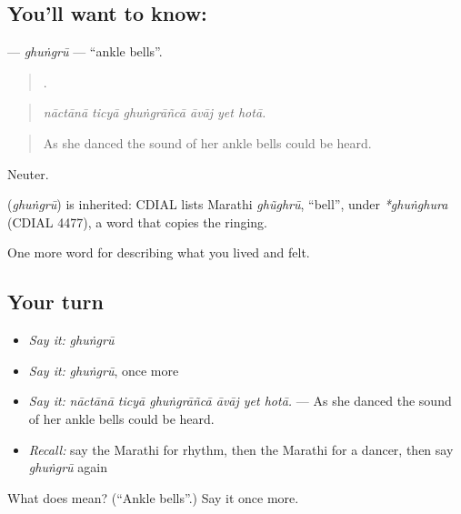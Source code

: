 \subsection*{You'll want to know: }
\textbf{} — \emph{ghuṅgrū} — \textquotedblleft{}ankle bells\textquotedblright{}.

\begin{quote}
     .
\end{quote}

\begin{quote}
\emph{nāctānā ticyā ghuṅgrāñcā āvāj yet hotā.}
\end{quote}

\begin{quote}
As she danced the sound of her ankle bells could be heard.
\end{quote}

Neuter.

\begin{cousinweb}
\textbf{} (\emph{ghuṅgrū}) is inherited: CDIAL lists Marathi \emph{ghũghrū}, \textquotedblleft{}bell\textquotedblright{}, under \emph{*ghuṅghura} (CDIAL 4477), a word that copies the ringing.
\end{cousinweb}

\begin{grammarlens}[title={What you've built}]
One more word for describing what you lived and felt.
\end{grammarlens}

\subsection*{Your turn}
\begin{itemize}
\raggedright
  \item \emph{Say it:} \emph{ghuṅgrū}
  \item \emph{Say it:} \emph{ghuṅgrū}, once more
  \item \emph{Say it:} \emph{nāctānā ticyā ghuṅgrāñcā āvāj yet hotā.} — As she danced the sound of her ankle bells could be heard.
  \item \emph{Recall:} say the Marathi for rhythm, then the Marathi for a dancer, then say \emph{ghuṅgrū} again
\end{itemize}

\begin{tcolorbox}[breakable,colback=teal!4,colframe=teal!35!black,title={Before you move on}]
What does  mean? (\textquotedblleft{}Ankle bells\textquotedblright{}.) Say it once more.
\end{tcolorbox}
